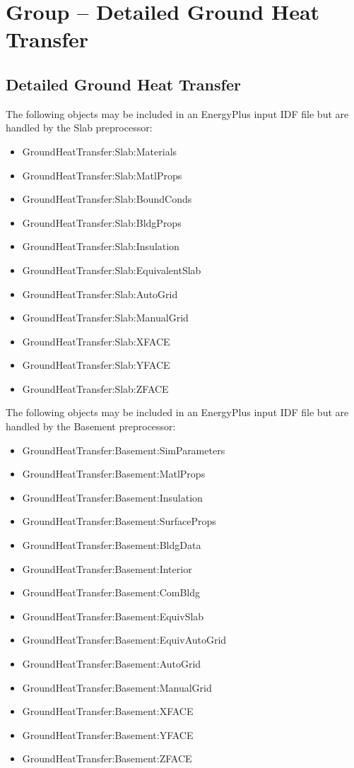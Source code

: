 \section{Group -- Detailed Ground Heat Transfer}\label{group-detailed-ground-heat-transfer}

\subsection{Detailed Ground Heat Transfer}\label{detailed-ground-heat-transfer}

The following objects may be included in an EnergyPlus input IDF file but are handled by the Slab preprocessor:

\begin{itemize}
\tightlist
\item
  GroundHeatTransfer:Slab:Materials
\item
  GroundHeatTransfer:Slab:MatlProps
\item
  GroundHeatTransfer:Slab:BoundConds
\item
  GroundHeatTransfer:Slab:BldgProps
\item
  GroundHeatTransfer:Slab:Insulation
\item
  GroundHeatTransfer:Slab:EquivalentSlab
\item
  GroundHeatTransfer:Slab:AutoGrid
\item
  GroundHeatTransfer:Slab:ManualGrid
\item
  GroundHeatTransfer:Slab:XFACE
\item
  GroundHeatTransfer:Slab:YFACE
\item
  GroundHeatTransfer:Slab:ZFACE
\end{itemize}

The following objects may be included in an EnergyPlus input IDF file but are handled by the Basement preprocessor:

\begin{itemize}
\tightlist
\item
  GroundHeatTransfer:Basement:SimParameters
\item
  GroundHeatTransfer:Basement:MatlProps
\item
  GroundHeatTransfer:Basement:Insulation
\item
  GroundHeatTransfer:Basement:SurfaceProps
\item
  GroundHeatTransfer:Basement:BldgData
\item
  GroundHeatTransfer:Basement:Interior
\item
  GroundHeatTransfer:Basement:ComBldg
\item
  GroundHeatTransfer:Basement:EquivSlab
\item
  GroundHeatTransfer:Basement:EquivAutoGrid
\item
  GroundHeatTransfer:Basement:AutoGrid
\item
  GroundHeatTransfer:Basement:ManualGrid
\item
  GroundHeatTransfer:Basement:XFACE
\item
  GroundHeatTransfer:Basement:YFACE
\item
  GroundHeatTransfer:Basement:ZFACE
\end{itemize}

